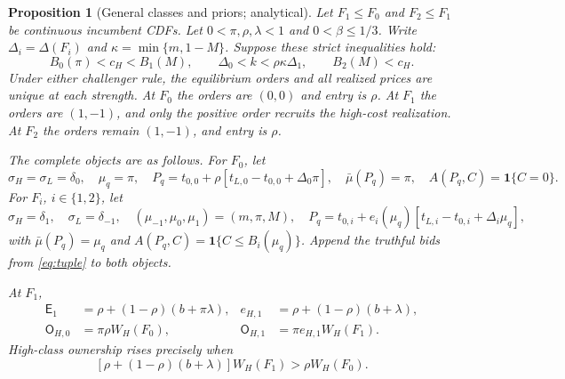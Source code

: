 \documentclass[12pt]{article}
\newtheorem{proposition}{Proposition}
\newcommand{\ind}{\mathbf 1}
\begin{document}
\begin{proposition}[General classes and priors; analytical]\label{prop:binary}
Let $F_1\le F_0$ and $F_2\le F_1$ be continuous incumbent CDFs.
Let $0<\pi,\rho,\lambda<1$ and $0<\beta\le1/3$.
Write $\Delta_i=\Delta(F_i)$ and $\kappa=\min\{m,1-M\}$.
Suppose these strict inequalities hold:
\begin{equation}\label{eq:region}
 B_0(\pi)<c_H<B_1(M),\qquad
 \Delta_0<k<\rho\kappa\Delta_1,\qquad
 B_2(M)<c_H.
\end{equation}
Under either challenger rule, the equilibrium orders and all realized prices are unique at each strength.
At $F_0$ the orders are $(0,0)$ and entry is $\rho$.
At $F_1$ the orders are $(1,-1)$, and only the positive order recruits the high-cost realization.
At $F_2$ the orders remain $(1,-1)$, and entry is $\rho$.

The complete objects are as follows.
For $F_0$, let
\begin{equation}\label{eq:weak-tuple}
 \sigma_H=\sigma_L=\delta_0,\quad \mu_q=\pi,\quad
 P_q=t_{0,0}+\rho[t_{L,0}-t_{0,0}+\Delta_0\pi],\quad
 \bar\mu(P_q)=\pi,\quad A(P_q,C)=\ind\{C=0\}.
\end{equation}
For $F_i$, $i\in\{1,2\}$, let
\begin{equation}\label{eq:full-tuple}
 \sigma_H=\delta_1,\quad\sigma_L=\delta_{-1},\quad
 (\mu_{-1},\mu_0,\mu_1)=(m,\pi,M),\quad
 P_q=t_{0,i}+e_i(\mu_q)[t_{L,i}-t_{0,i}+\Delta_i\mu_q],
\end{equation}
with $\bar\mu(P_q)=\mu_q$ and $A(P_q,C)=\ind\{C\le B_i(\mu_q)\}$.
Append the truthful bids from \eqref{eq:tuple} to both objects.

At $F_1$,
\begin{align}\label{eq:entry-own}
 \mathsf E_1&=\rho+(1-\rho)(b+\pi\lambda),&
 e_{H,1}&=\rho+(1-\rho)(b+\lambda),\\
 \mathsf O_{H,0}&=\pi\rho W_H(F_0),&
 \mathsf O_{H,1}&=\pi e_{H,1}W_H(F_1).\nonumber
\end{align}
High-class ownership rises precisely when
\begin{equation}\label{eq:own-condition}
 [\rho+(1-\rho)(b+\lambda)]W_H(F_1)>\rho W_H(F_0).
\end{equation}
\end{proposition}
\end{document}

